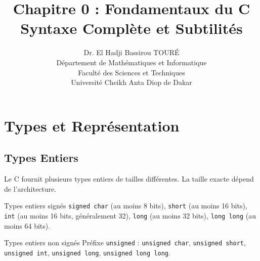 \documentclass[10pt,a4paper]{article}
\title{\textbf{Chapitre 0 : Fondamentaux du C}\\
\large Syntaxe Complète et Subtilités}
\author{Dr. El Hadji Bassirou TOURÉ\\
Département de Mathématiques et Informatique\\
Faculté des Sciences et Techniques\\
Université Cheikh Anta Diop de Dakar}
\date{}
\begin{document}
\maketitle

\section{Types et Représentation}

\subsection{Types Entiers}

Le C fournit plusieurs types entiers de tailles différentes. La taille exacte dépend de l'architecture.

\begin{techbox}{Types entiers signés}
\texttt{signed char} (au moins 8 bits), \texttt{short} (au moins 16 bits), \texttt{int} (au moins 16 bits, généralement 32), \texttt{long} (au moins 32 bits), \texttt{long long} (au moins 64 bits).
\end{techbox}

\begin{techbox}{Types entiers non signés}
Préfixe \texttt{unsigned} : \texttt{unsigned char}, \texttt{unsigned short}, \texttt{unsigned int}, \texttt{unsigned long}, \texttt{unsigned long long}.
\end{techbox}

\begin{center}
\end{center}
\end{document}
